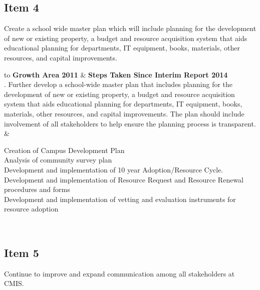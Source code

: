 \subsection{Item 4}

Create a school wide master plan which will include planning for the development of new or existing property, a budget and resource acquisition system that aids educational planning for departments, IT equipment, books, materials, other resources, and capital improvements.

\begin{longtabu} to \textwidth {|X|X|}
\hline
\textbf{Growth Area 2011} & \textbf{Steps Taken Since Interim Report 2014} \\
.  Further develop a school-wide master plan that includes planning for the development of new or existing property, a budget and resource acquisition system that aids educational planning for departments, IT equipment, books, materials, other resources, and capital improvements. The plan should include involvement of all stakeholders to help ensure the planning process is transparent.
 &

\parbox[t]{2.8in}{
Creation of Campus Development Plan\\
Analysis of community survey plan\\
Development and implementation of 10 year Adoption/Resource Cycle. \\
Development and implementation of Resource Request and Resource Renewal procedures and forms \\
Development and implementation of vetting and evaluation instruments for resource adoption   }\\
\hline

\end{longtabu}

\subsection{Item 5}

 Continue to improve and expand communication among all stakeholders at CMIS.


